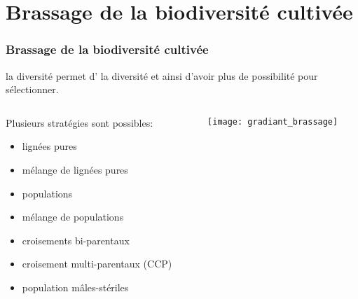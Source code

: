 \section{Brassage de la biodiversité cultivée}
\begin{frame}\tableofcontents[currentsection,currentsubsection,subsectionstyle=show/show/hide]\end{frame}

\begin{frame}
\frametitle{Brassage de la biodiversité cultivée}

 la diversité permet d' la diversité et ainsi d'avoir plus de possibilité pour sélectionner.

\begin{columns}

\begin{column}{.4\textwidth}

Plusieurs stratégies sont possibles:

\begin{itemize}
\item lignées pures
\item mélange de lignées pures
\item populations
\item mélange de populations
\item croisements  bi-parentaux 
\item croisement multi-parentaux (CCP)
\item population mâles-stériles
\end{itemize}

\end{column}

\begin{column}{.6\textwidth}
\begin{center}
\texttt{[image: gradiant\_brassage]} \\
\end{center}
\end{column}

\end{columns}

\end{frame}


